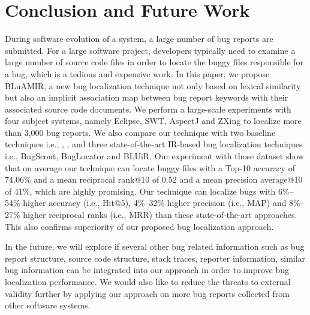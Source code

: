 \documentclass[conference]{IEEEtran}
\begin{document}
\section{Conclusion and Future Work} \label{sec:conclusionANDfuture}
During software evolution of a system, a large number of bug reports are submitted. For a large software project, developers typically need to examine a large number of source code files in order to locate the buggy files responsible for a bug, which is a tedious and expensive work. In this paper, we propose BLuAMIR, a new bug localization technique not only based on lexical similarity but also an implicit association map between bug report keywords with their associated source code documents. We perform a large-scale experiments with four subject systems, namely Eclipse, SWT, AspectJ and ZXing to localize more than 3,000 bug reports.
We also compare our technique with two baseline techniques i.e., \cite{vector-space-model}, \cite{MarcusLSI}, and three state-of-the-art IR-based bug localization techniques i.e., BugScout\cite{Nguyen}, BugLocator\cite{Jian} and BLUiR\cite{Saha}.
Our experiment with those dataset show that on average our technique can locate buggy files with a Top-10 accuracy of 74.06\% and a mean reciprocal rank@10 of 0.52 and a mean precision average@10 of 41\%, which are highly promising.   
Our technique can localize bugs with 6\%--54\% higher accuracy (i.e., Hit@5), 4\%--32\% higher precision (i.e., MAP) and 8\%--27\% higher reciprocal ranks (i.e., MRR) than these state-of-the-art approaches. This also confirms superiority of our proposed bug localization approach. 

In the future, we will explore if several other bug related information such as bug report structure, source code structure, stack traces, reporter information, similar bug information can be integrated into our approach in order to improve bug localization performance. We would also like to reduce the threats to external validity further by applying our approach on more bug reports collected from other software systems.

\balance
\end{document}
